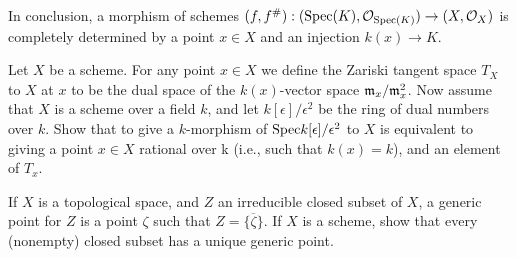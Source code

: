 \begin{sol}
	In conclusion, a morphism of schemes $(f,f^{\#}): (\mathrm{Spec} (K), \mathcal{O}_{\mathrm{Spec}(K)}) \to (X, \mathcal{O}_X)$ is completely determined by a point $x \in X$ and an injection $k(x) \to K$.
\end{sol}

\begin{ex}
	Let $X$ be a scheme. For any point $x \in X$ we define the Zariski tangent space $T_X$ to $X$ at $x$ to be the dual space of the $k(x)$-vector space $\mathfrak{m}_x/\mathfrak{m}_x^2$. Now assume that $X$ is a scheme over a field $k$, and let $k[\epsilon]/\epsilon^2$ be the ring of dual numbers over $k$. Show that to give a $k$-morphism of $\mathrm{Spec} k[\epsilon]/\epsilon^2$ to $X$ is equivalent to giving a point $x \in X$ rational over k (i.e., such that $k(x) = k$), and an element of $T_x$.
\end{ex}

\begin{ex}
	If $X$ is a topological space, and $Z$ an irreducible closed subset of $X$, a generic point for $Z$ is a point $\zeta$ such that $Z = \overline{\{\zeta\}}$. If $X$ is a scheme, show that every (nonempty) closed subset has a unique generic point.
\end{ex}

